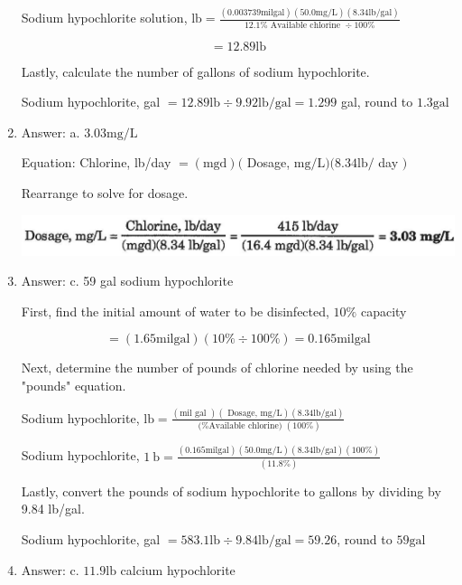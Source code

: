 \documentclass[10pt]{article}
\begin{document}
\begin{enumerate}
Sodium hypochlorite solution, $\mathrm{lb}=\frac{(0.003739 \mathrm{mil} \mathrm{gal})(50.0 \mathrm{mg} / \mathrm{L})(8.34 \mathrm{lb} / \mathrm{gal})}{12.1 \% \text { Available chlorine } \div 100 \%}$

$$
=12.89 \mathrm{lb}
$$

Lastly, calculate the number of gallons of sodium hypochlorite.

Sodium hypochlorite, gal $=12.89 \mathrm{lb} \div 9.92 \mathrm{lb} / \mathrm{gal}=1.299$ gal, round to $1.3 \mathrm{gal}$

  \item Answer: a. $3.03 \mathrm{mg} / \mathrm{L}$

Equation: Chlorine, lb/day $=(\mathrm{mgd})($ Dosage, $\mathrm{mg} / \mathrm{L})(8.34 \mathrm{lb} /$ day $)$

Rearrange to solve for dosage.

\includegraphics[max width=\textwidth]{2022_11_10_d6923b5a412978ed01fcg-36}

  \item Answer: c. 59 gal sodium hypochlorite

First, find the initial amount of water to be disinfected, $10 \%$ capacity

$$
=(1.65 \mathrm{mil} \mathrm{gal})(10 \% \div 100 \%)=0.165 \mathrm{mil} \mathrm{gal}
$$

Next, determine the number of pounds of chlorine needed by using the "pounds" equation.

Sodium hypochlorite, $\mathrm{lb}=\frac{(\mathrm{mil} \text { gal })(\text { Dosage, } \mathrm{mg} / \mathrm{L})(8.34 \mathrm{lb} / \mathrm{gal})}{\text { (\% Available chlorine) }(100 \%)}$

Sodium hypochlorite, $1 \mathrm{~b}=\frac{(0.165 \mathrm{mil} \mathrm{gal})(50.0 \mathrm{mg} / \mathrm{L})(8.34 \mathrm{lb} / \mathrm{gal})(100 \%)}{(11.8 \%)}$

Lastly, convert the pounds of sodium hypochlorite to gallons by dividing by 9.84 lb/gal.

Sodium hypochlorite, gal $=583.1 \mathrm{lb} \div 9.84 \mathrm{lb} / \mathrm{gal}=59.26$, round to $59 \mathrm{gal}$

  \item Answer: c. $11.9 \mathrm{lb}$ calcium hypochlorite


\end{enumerate}
\end{document}
